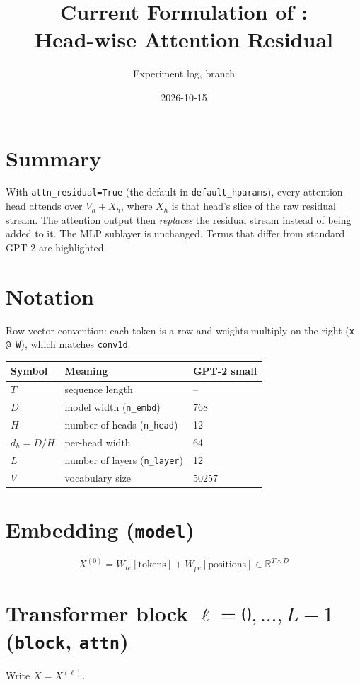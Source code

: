 \documentclass[11pt]{article}
\title{Current Formulation of \code{src/model.py}:\\Head-wise Attention Residual}
\author{Experiment log, branch \code{attention-experiments}}
\date{2026-10-15}
\newcommand{\code}[1]{\texttt{#1}}
\begin{document}
\maketitle

\section*{Summary}
With \code{attn\_residual=True} (the default in \code{default\_hparams}), every attention
head attends over $V_h + X_h$, where $X_h$ is that head's slice of the raw residual
stream. The attention output then \emph{replaces} the residual stream instead of being
added to it. The MLP sublayer is unchanged. Terms that differ from standard GPT-2 are
\colorbox{orange!15}{highlighted}.

\section*{Notation}
Row-vector convention: each token is a row and weights multiply on the right
(\code{x @ W}), which matches \code{conv1d}.
\begin{center}
\begin{tabular}{lll}
\toprule
Symbol & Meaning & GPT-2 small \\
\midrule
$T$ & sequence length & -- \\
$D$ & model width (\code{n\_embd}) & 768 \\
$H$ & number of heads (\code{n\_head}) & 12 \\
$d_h = D/H$ & per-head width & 64 \\
$L$ & number of layers (\code{n\_layer}) & 12 \\
$V$ & vocabulary size & 50257 \\
\bottomrule
\end{tabular}
\end{center}

\section{Embedding \quad (\code{model})}
\[
X^{(0)} = W_{te}[\text{tokens}] + W_{pe}[\text{positions}] \in \mathbb{R}^{T\times D}
\]

\section{Transformer block $\ell = 0,\dots,L-1$ \quad (\code{block}, \code{attn})}
Write $X = X^{(\ell)}$.
\end{document}
